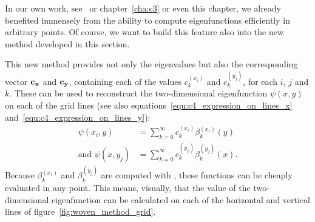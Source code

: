 In our own work, see~\cite{baeyens_improvements_2022} or chapter~\ref{cha:c3} or even this chapter, we already benefited immensely from the ability to compute eigenfunctions efficiently in arbitrary points. Of course, we want to build this feature also into the new method developed in this section.

This new method provides not only the eigenvalues but also the corresponding vector $\vb{c_x}$ and $\vb{c_y}$, containing each of the values $c_k^{(x_i)}$ and $c_k^{(y_j)}$, for each $i$, $j$ and $k$. These can be used to reconstruct the two-dimensional eigenfunction $\psi(x, y)$ on each of the grid lines (see also equations~\eqref{equ:c4_expression_on_lines_x} and~\eqref{equ:c4_expression_on_lines_y}):
\begin{align*}
    \psi(x_i, y)             & = \sum_{k=0}^\infty c_k^{(x_i)} \beta_k^{(x_i)}(y)          \\
    \text{and } \psi(x, y_j) & = \sum_{k=0}^\infty c_k^{(y_j)} \beta_k^{(y_j)}(x) \text{.}
\end{align*}
Because $\beta_k^{(x_i)}$ and $\beta_k^{(y_j)}$ are computed with , these functions can be cheaply evaluated in any point. This means, visually, that the value of the two-dimensional eigenfunction can be calculated on each of the horizontal and vertical lines of figure~\ref{fig:woven_method_grid}.


